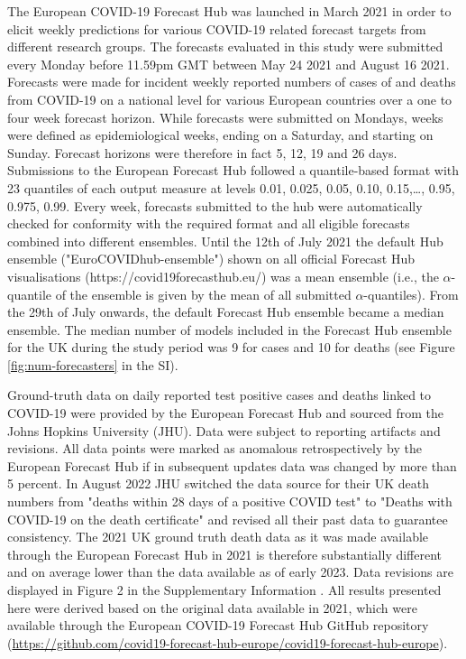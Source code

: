 \documentclass[10pt,a4paper,twocolumn]{article}
\begin{document}
The European COVID-19 Forecast Hub \cite{sherrattPredictivePerformanceMultimodel2022} was launched in March 2021 in order to elicit weekly predictions for various COVID-19 related forecast targets from different research groups. The forecasts evaluated in this study were submitted every Monday before 11.59pm GMT between May 24 2021 and August 16 2021. Forecasts were made for incident weekly reported numbers of cases of and deaths from COVID-19 on a national level for various European countries over a one to four week forecast horizon. While forecasts were submitted on Mondays, weeks were defined as epidemiological weeks, ending on a Saturday, and starting on Sunday. Forecast horizons were therefore in fact 5, 12, 19 and 26 days. Submissions to the European Forecast Hub followed a quantile-based format with 23 quantiles of each output measure at levels 0.01, 0.025, 0.05, 0.10, 0.15,…, 0.95, 0.975, 0.99.
Every week, forecasts submitted to the hub were automatically checked for conformity with the required format and all eligible forecasts combined into different ensembles. Until the 12th of July 2021 the default Hub ensemble ("EuroCOVIDhub-ensemble") shown on all official Forecast Hub visualisations (https://covid19forecasthub.eu/) was a mean ensemble (i.e., the $\alpha$-quantile of the ensemble is given by the mean of all submitted $\alpha$-quantiles). From the 29th of July onwards, the default Forecast Hub ensemble became a median ensemble. The median number of models included in the Forecast Hub ensemble for the UK during the study period was 9 for cases and 10 for deaths (see Figure \ref{fig:num-forecasters} in the SI). 

Ground-truth data on daily reported test positive cases and deaths linked to COVID-19 were provided by the European Forecast Hub and sourced from the Johns Hopkins University (JHU). Data were subject to reporting artifacts and revisions. All data points were marked as anomalous retrospectively by the European Forecast Hub if in subsequent updates data was changed by more than 5 percent. In August 2022 JHU switched the data source for their UK death numbers from "deaths within 28 days of a positive COVID test" to "Deaths with COVID-19 on the death certificate" and revised all their past data to guarantee consistency. The 2021 UK ground truth death data as it was made available through the European Forecast Hub in 2021 is therefore substantially different and on average lower than the data available as of early 2023. Data revisions are displayed in Figure 2 in the Supplementary Information \cite{bosseSupplementaryInformationHuman2023}. All results presented here were derived based on the original data available in 2021, which were available through the European COVID-19 Forecast Hub GitHub repository (\url{https://github.com/covid19-forecast-hub-europe/covid19-forecast-hub-europe}). 
\end{document}
